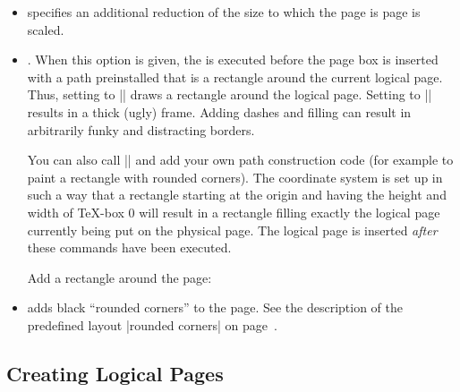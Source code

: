 \begin{command}{\pgfpageslogicalpageoptions{}}
\begin{itemize}
            \example Let logical page 2 show what logical page 1 showed on the
            just-shipped-out physical page:
\begin{codeexample}
\end{codeexample}
        \item {} specifies an additional
            reduction of the size to which the page is page is scaled.
        \item {}. When this option is given,
            the  is executed before the page box is inserted with a
            path preinstalled that is a rectangle around the current logical
            page. Thus, setting  to |\pgfstroke| draws a rectangle
            around the logical page. Setting  to
            |\pgfsetlinewidth{3pt}\pgfstroke| results in a thick (ugly) frame.
            Adding dashes and filling can result in arbitrarily funky and
            distracting borders.

            You can also call |\pgfdiscardpath| and add your own path
            construction code (for example to paint a rectangle with rounded
            corners). The coordinate system is  set up in such a way that a
            rectangle starting at the origin and having the height and width of
            \TeX-box 0 will result in a rectangle filling exactly the logical
            page currently being put on the physical page. The logical page is
            inserted \emph{after} these commands have been executed.

            \example Add a rectangle around the page:
\begin{codeexample}
\end{codeexample}
        \item {} adds black ``rounded
            corners'' to the page. See the description of the predefined layout
            |rounded corners| on page~\pageref{layout-rounded-corners}.
    \end{itemize}
\end{command}


\subsection{Creating Logical Pages}

